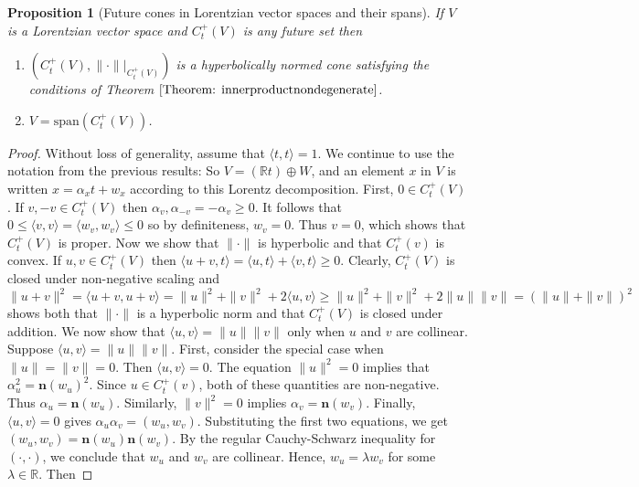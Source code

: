 \documentclass[a4paper,11pt]{article}
\numberwithin{equation}{section}
\theoremstyle{definition}
\theoremstyle{plain}
\newtheorem{Proposition}[Definition]{Proposition}
\newcommand{\R}{\mathbb R}
\newcommand{\spn}{\mathrm{span}}
\newcommand{\inner}[2]{\langle #1, #2 \rangle}
\newcommand{\norm}[1]{\| #1\|}
\begin{document}
\begin{Proposition}[Future cones in Lorentzian vector spaces and their spans]\label{Prop: Future cones in Lorentzian vector spaces and their spans}
    If $V$ is a Lorentzian vector space and $C_{t}^{+}(V)$ is any future set then
    \begin{enumerate}
        \item $(C_{t}^{+}(V), \norm{\cdot}|_{C_{t}^{+}(V)})$ is a hyperbolically normed cone satisfying the conditions of Theorem $\ref{Theorem: innerproductnondegenerate}$. 
        \item $V = \spn(C_{t}^{+}(V))$.
    \end{enumerate}
\end{Proposition}
\begin{proof}
    Without loss of generality, assume that $\inner{t}{t} = 1$. We continue to use the notation from the previous results: So $V = (\R t) \oplus W$, and an element $x$ in $V$ is written $x = \alpha_x t + w_x$ according to this Lorentz decomposition. First, $0 \in C_{t}^{+}(V)$. If $v, -v \in C_{t}^{+}(V)$ then $\alpha_{v}, \alpha_{-v} = - \alpha_{v} \geq 0$. It follows that $0 \leq \inner{v}{v} = \inner{w_{v}}{w_{v}} \leq 0$ so by definiteness, $w_{v} = 0$. Thus $v = 0$, which shows that $C_t^+(V)$ is proper. Now we show that $\norm{\cdot}$ is hyperbolic and that $C_{t}^{+}(v)$ is convex. If $u, v \in C_{t}^{+}(V)$ then $\inner{u + v}{t} = \inner{u}{t} + \inner{v}{t} \geq 0$. Clearly, $C_{t}^{+}(V)$ is closed under non-negative scaling and
    $$\norm{u + v}^{2} = \inner{u + v}{u + v} = \norm{u}^{2} + \norm{v}^{2} + 2\inner{u}{v} \geq \norm{u}^{2} + \norm{v}^{2} + 2\norm{u}\norm{v} = (\norm{u} + \norm{v})^{2}$$
    shows both that $\norm{\cdot}$ is a hyperbolic norm and that $C_{t}^{+}(V)$ is closed under addition. We now show that $\inner{u}{v} = \norm{u}\norm{v}$ only when $u$ and $v$ are collinear. Suppose $\inner{u}{v} = \norm{u}\norm{v}$. First, consider the special case when $\norm{u} = \norm{v} = 0$. Then $\inner{u}{v} = 0$. The equation $\norm{u}^{2} = 0$ implies that $\alpha_{u}^{2} = \mathbf{n}(w_{u})^{2}$. Since $u \in C_{t}^{+}(v)$, both of these quantities are non-negative. Thus $\alpha_{u} = \mathbf{n}(w_{u})$. Similarly, $\norm{v}^{2} = 0$ implies $\alpha_{v} = \mathbf{n}(w_{v})$. Finally, $\inner{u}{v} = 0$ gives $\alpha_{u}\alpha_{v} = (w_{u}, w_{v})$. Substituting the first two equations, we get $(w_{u}, w_{v}) = \mathbf{n}(w_{u})\mathbf{n}(w_{v})$. By the regular Cauchy-Schwarz inequality for $(\cdot, \cdot)$, we conclude that $w_{u}$ and $w_{v}$ are collinear. Hence, $w_{u} = \lambda w_{v}$ for some $\lambda \in \R$. Then

\end{proof}
\end{document}
